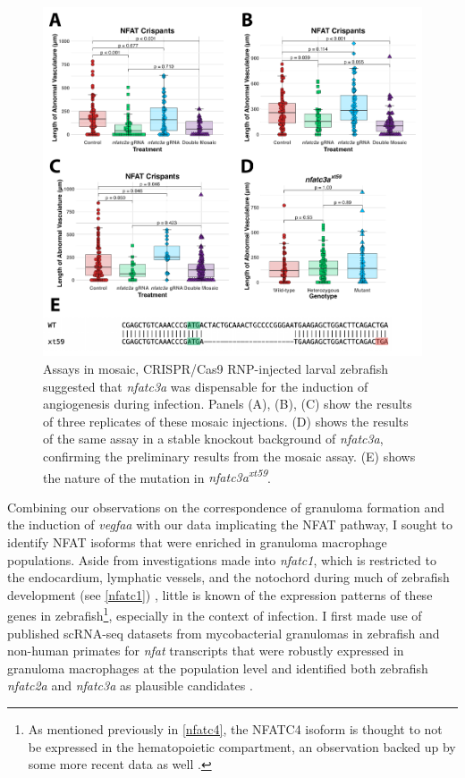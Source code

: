 \begin{figure}
\centering
\includegraphics[width=\textwidth]{images/mosaicnfatc3a.pdf}
\caption[\textit{nfatc3a} is dispensable for angiogenesis]{Assays in mosaic, CRISPR/Cas9 RNP\hyp{}injected larval zebrafish suggested that \textit{nfatc3a} was dispensable for the induction of angiogenesis during infection. Panels (A), (B), (C) show the results of three replicates of these mosaic injections. (D) shows the results of the same assay in a stable knockout background of \textit{nfatc3a}, confirming the preliminary results from the mosaic assay. (E) shows the nature of the mutation in \textit{nfatc3a\textsuperscript{xt59}}.}
\label{figure:mosaic}
\end{figure}

Combining our observations on the correspondence of granuloma formation and the induction of \textit{vegfaa} with our data implicating the NFAT pathway, I sought to identify NFAT isoforms that were enriched in granuloma macrophage populations. Aside from investigations made into \textit{nfatc1}, which is restricted to the endocardium, lymphatic vessels, and the notochord during much of zebrafish development (see \autoref{nfatc1}) \citep{Pestel2016, Shin2019, Bagwell2020}, little is known of the expression patterns of these genes in zebrafish\footnote{As mentioned previously in \autoref{nfatc4}, the NFATC4 isoform is thought to not be expressed in the hematopoietic compartment, an observation backed up by some more recent data as well \citep{Peuker2022}.}, especially in the context of infection. I first made use of published scRNA\hyp{}seq datasets from mycobacterial granulomas in zebrafish and non\hyp{}human primates for \textit{nfat} transcripts that were robustly expressed in granuloma macrophages at the population level and identified both zebrafish \textit{nfatc2a} and \textit{nfatc3a} as plausible candidates \citep{Cronan2021, Gideon2022}.

